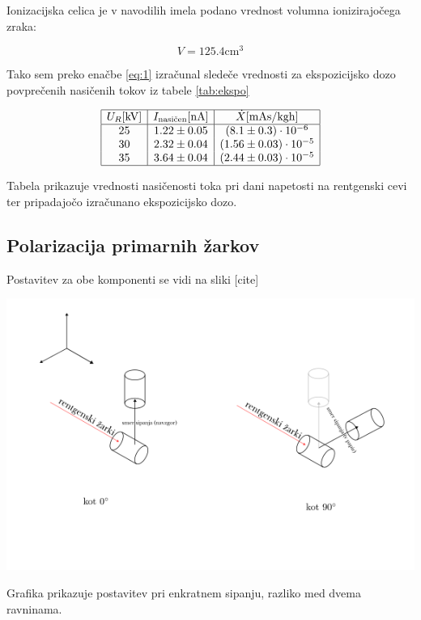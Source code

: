 \documentclass[11pt]{article}
\begin{document}
Ionizacijska celica je v navodilih imela podano vrednost volumna ionizirajočega zraka:

\[ V = 125.4 \mathrm{cm} ^3
\]

Tako sem preko enačbe \ref{eq:1} izračunal sledeče vrednosti za ekspozicijsko dozo povprečenih nasičenih tokov iz tabele \ref{tab:ekspo}
\begin{tabela}[H]
  \centering
\[
  \begin{array}{|c|c|c|}\hline
    U_{R} [\mathrm{kV}] & I_{\text{nasičen}} [\mathrm{nA}] & \dot{X} [\mathrm{mAs/kgh}] \\\hline
    25 & 1.22 \pm 0.05 & (8.1 \pm 0.3) \cdot 10 ^{-6} \\
    30 & 2.32 \pm 0.04 & (1.56 \pm 0.03) \cdot 10 ^{-5} \\
    35 & 3.64 \pm 0.04 & (2.44 \pm 0.03) \cdot 10 ^{-5} \\\hline
    \end{array}
\]
\caption{\small Tabela prikazuje vrednosti nasičenosti toka pri dani napetosti na rentgenski cevi ter pripadajočo izračunano ekspozicijsko dozo.}\label{tab:ekspo}
\end{tabela}

\subsection{Polarizacija primarnih žarkov}\label{sec:orgfe9b6b1}

Postavitev za obe komponenti se vidi na sliki [cite]

\begin{slika}[H]
\begin{center}
\includegraphics[width=.9\linewidth]{figures/1xsipanje}
\end{center}
\caption{\small Grafika prikazuje postavitev pri enkratnem sipanju, razliko med dvema ravninama. }
\end{slika}
\end{document}
